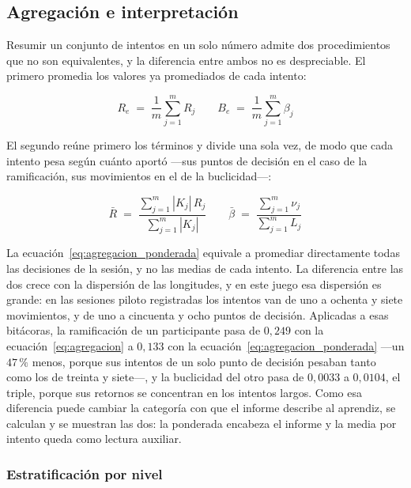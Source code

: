 \documentclass{book}
\begin{document}
\subsection*{Agregación e interpretación}

Resumir un conjunto de intentos en un solo número admite dos
procedimientos que no son equivalentes, y la diferencia entre ambos
no es despreciable. El primero promedia los valores ya promediados
de cada intento:

\begin{equation}
    R_e \;=\; \frac{1}{m}\sum_{j=1}^{m} R_{j}
    \qquad
    B_e \;=\; \frac{1}{m}\sum_{j=1}^{m} \beta_{j}
    \label{eq:agregacion}
\end{equation}

El segundo reúne primero los términos y divide una sola vez, de
modo que cada intento pesa según cuánto aportó —sus puntos de
decisión en el caso de la ramificación, sus movimientos en el de la
buclicidad—:

\begin{equation}
    \bar{R} \;=\; \frac{\sum_{j=1}^{m} |K_j| \, R_{j}}{\sum_{j=1}^{m} |K_j|}
    \qquad
    \bar{\beta} \;=\; \frac{\sum_{j=1}^{m} \nu_{j}}{\sum_{j=1}^{m} L_{j}}
    \label{eq:agregacion_ponderada}
\end{equation}

La ecuación~\ref{eq:agregacion_ponderada} equivale a promediar
directamente todas las decisiones de la sesión, y no las medias de
cada intento. La diferencia entre las dos crece con la dispersión
de las longitudes, y en este juego esa dispersión es grande: en las
sesiones piloto registradas los intentos van de uno a ochenta y
siete movimientos, y de uno a cincuenta y ocho puntos de decisión.
Aplicadas a esas bitácoras, la ramificación de un participante pasa
de $0{,}249$ con la ecuación~\ref{eq:agregacion} a $0{,}133$ con la
ecuación~\ref{eq:agregacion_ponderada} —un $47\,\%$ menos, porque
sus intentos de un solo punto de decisión pesaban tanto como los de
treinta y siete—, y la buclicidad del otro pasa de $0{,}0033$ a
$0{,}0104$, el triple, porque sus retornos se concentran en los
intentos largos. Como esa diferencia puede cambiar la categoría con
que el informe describe al aprendiz, se calculan y se muestran las
dos: la ponderada encabeza el informe y la media por intento queda
como lectura auxiliar.

\subsubsection*{Estratificación por nivel}
\end{document}
